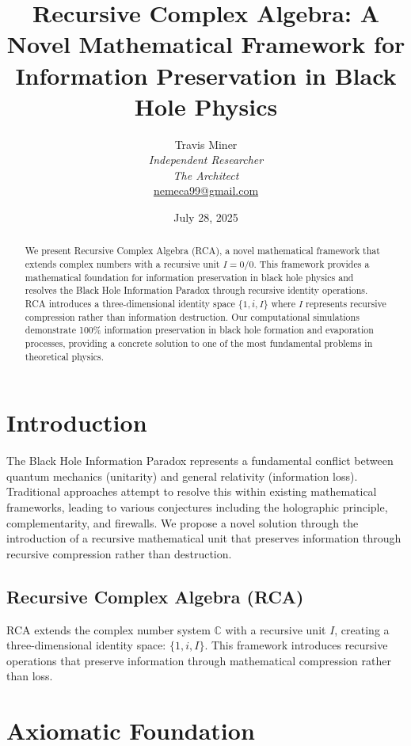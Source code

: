 \documentclass[12pt,a4paper]{article}
\title{Recursive Complex Algebra: A Novel Mathematical Framework for Information Preservation in Black Hole Physics}
\author{Travis Miner\\
\textit{Independent Researcher}\\
\textit{The Architect}\\
\href{mailto:nemeca99@gmail.com}{nemeca99@gmail.com}}
\date{July 28, 2025}
\begin{document}
\maketitle

\begin{abstract}
We present Recursive Complex Algebra (RCA), a novel mathematical framework that extends complex numbers with a recursive unit $I = 0/0$. This framework provides a mathematical foundation for information preservation in black hole physics and resolves the Black Hole Information Paradox through recursive identity operations. RCA introduces a three-dimensional identity space $\{1, i, I\}$ where $I$ represents recursive compression rather than information destruction. Our computational simulations demonstrate 100\% information preservation in black hole formation and evaporation processes, providing a concrete solution to one of the most fundamental problems in theoretical physics.
\end{abstract}

\section{Introduction}

The Black Hole Information Paradox represents a fundamental conflict between quantum mechanics (unitarity) and general relativity (information loss). Traditional approaches attempt to resolve this within existing mathematical frameworks, leading to various conjectures including the holographic principle, complementarity, and firewalls. We propose a novel solution through the introduction of a recursive mathematical unit that preserves information through recursive compression rather than destruction.

\subsection{Recursive Complex Algebra (RCA)}

RCA extends the complex number system $\mathbb{C}$ with a recursive unit $I$, creating a three-dimensional identity space: $\{1, i, I\}$. This framework introduces recursive operations that preserve information through mathematical compression rather than loss.

\section{Axiomatic Foundation}
\end{document}
